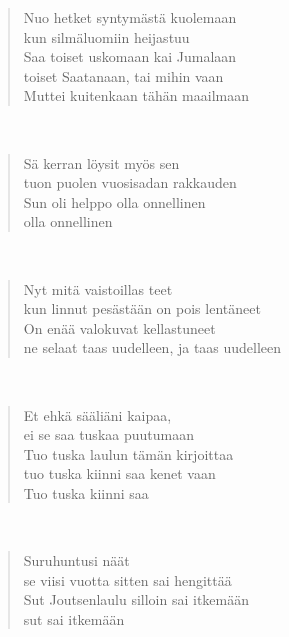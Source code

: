 \noindent\begin{minipage}{\linewidth}
\begin{verse}
	Nuo hetket syntymästä kuolemaan\\
	kun silmäluomiin heijastuu\\
	Saa toiset uskomaan kai Jumalaan\\
	toiset Saatanaan, tai mihin vaan\\
	Muttei kuitenkaan tähän maailmaan\\
\end{verse}
\end{minipage}\\[10pt]
\noindent\begin{minipage}{\linewidth}
\begin{verse}
	Sä kerran löysit myös sen\\
	tuon puolen vuosisadan rakkauden\\
	Sun oli helppo olla onnellinen\\
	olla onnellinen\\
\end{verse}
\end{minipage}\\[10pt]
\noindent\begin{minipage}{\linewidth}
\begin{verse}
	Nyt mitä vaistoillas teet\\
	kun linnut pesästään on pois lentäneet\\
	On enää valokuvat kellastuneet\\
	ne selaat taas uudelleen, ja taas uudelleen\\
\end{verse}
\end{minipage}\\[10pt]
\noindent\begin{minipage}{\linewidth}
\begin{verse}
	Et ehkä sääliäni kaipaa,\\
	ei se saa tuskaa puutumaan\\
	Tuo tuska laulun tämän kirjoittaa\\
	tuo tuska kiinni saa kenet vaan\\
	Tuo tuska kiinni saa\\
\end{verse}
\end{minipage}\\[10pt]
\noindent\begin{minipage}{\linewidth}
\begin{verse}
	Suruhuntusi näät\\
	se viisi vuotta sitten sai hengittää\\
	Sut Joutsenlaulu silloin sai itkemään\\
	sut sai itkemään\\
\end{verse}
\end{minipage}\\[10pt]
